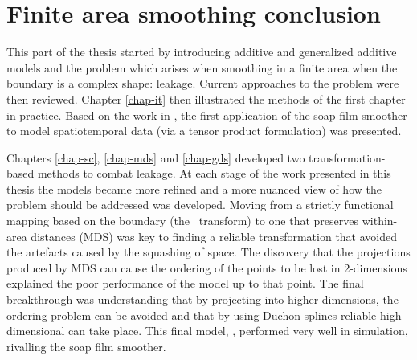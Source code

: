 \section{Finite area smoothing conclusion}
\label{gds-conclusion}

This part of the thesis started by introducing additive and generalized additive models and the problem which arises when smoothing in a finite area when the boundary is a complex shape: leakage. Current approaches to the problem were then reviewed. Chapter \ref{chap-it} then illustrated the methods of the first chapter in practice. Based on the work in , the first application of the soap film smoother to model spatiotemporal data (via a tensor product formulation) was presented.

Chapters \ref{chap-sc}, \ref{chap-mds} and \ref{chap-gds} developed two transformation-based methods to combat leakage. At each stage of the work presented in this thesis the models became more refined and a more nuanced view of how the problem should be addressed was developed. Moving from a strictly functional mapping based on the boundary (the \sch\ transform) to one that preserves within-area distances (MDS) was key to finding a reliable transformation that avoided the artefacts caused by the squashing of space. The discovery that the projections produced by MDS can cause the ordering of the points to be lost in 2-dimensions explained the poor performance of the model up to that point. The final breakthrough was understanding that by projecting into higher dimensions, the ordering problem can be avoided and that by using Duchon splines reliable high dimensional can take place. This final model, \mdsds, performed very well in simulation, rivalling the soap film smoother.

